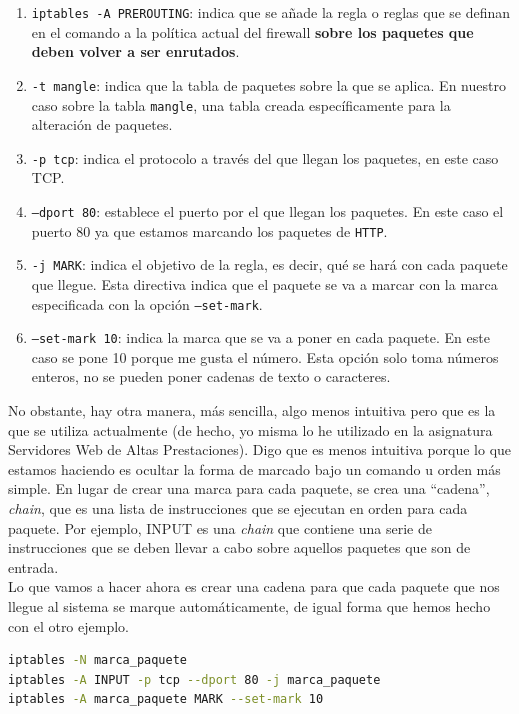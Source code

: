 \documentclass[11pt,a4paper]{article}
\begin{document}
\begin{enumerate}
	\item \texttt{iptables -A PREROUTING}: indica que se añade la regla o reglas que se definan en el comando a la política actual del firewall \textbf{sobre los paquetes que deben volver a ser enrutados}.
	\item \texttt{-t mangle}: indica que la tabla de paquetes sobre la que se aplica. En nuestro caso sobre la tabla \texttt{mangle}, una tabla creada específicamente para la alteración de paquetes.
	\item \texttt{-p tcp}: indica el protocolo a través del que llegan los paquetes, en este caso TCP.
	\item \texttt{--dport 80}: establece el puerto por el que llegan los paquetes. En este caso el puerto 80 ya que estamos marcando los paquetes de \texttt{HTTP}.
	\item \texttt{-j MARK}: indica el objetivo de la regla, es decir, qué se hará con cada paquete que llegue. Esta directiva indica que el paquete se va a marcar con la marca especificada con la opción \texttt{--set-mark}.
	\item \texttt{--set-mark 10}: indica la marca que se va a poner en cada paquete. En este caso se pone 10 porque me gusta el número. Esta opción solo toma números enteros, no se pueden poner cadenas de texto o caracteres.
\end{enumerate}

No obstante, hay otra manera, más sencilla, algo menos intuitiva pero que es la que se utiliza actualmente (de hecho, yo misma lo he utilizado en la asignatura Servidores Web de Altas Prestaciones). Digo que es menos intuitiva porque lo que estamos haciendo es ocultar la forma de marcado bajo un comando u orden más simple. En lugar de crear una marca para cada paquete, se crea una ``cadena'', \textit{chain}, que es una lista de instrucciones que se ejecutan en orden para cada paquete. Por ejemplo, INPUT es una \textit{chain} que contiene una serie de instrucciones que se deben llevar a cabo sobre aquellos paquetes que son de entrada.\\

Lo que vamos a hacer ahora es crear una cadena para que cada paquete que nos llegue al sistema se marque automáticamente, de igual forma que hemos hecho con el otro ejemplo.\\

\begin{lstlisting}[language=bash,caption={iptables con chain},captionpos=b]
iptables -N marca_paquete
iptables -A INPUT -p tcp --dport 80 -j marca_paquete
iptables -A marca_paquete MARK --set-mark 10
\end{lstlisting}
\end{document}
